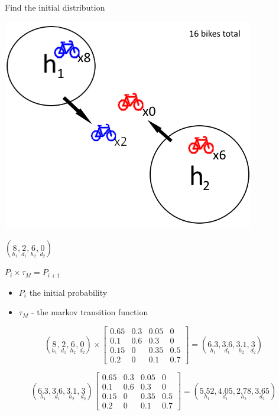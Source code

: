 \begin{frame}{Find the initial distribution}
\begin{center}

\includegraphics[scale=0.7]{graphics/initialworld2}
	
$(
\underset{h_1}{8},
\underset{d_1}{2},
\underset{h_2}{6},
\underset{d_2}{0}
)$
\end{center}
\end{frame}

\begin{frame}[fragile]
	

	
\begin{center}	
	
$ P_i \times \tau_M = P_{i+1}$\\

\begin{itemize}
	\item \textbf{$ P_i $} the initial probability
	\item \textbf{$ \tau_M $} - the markov transition function 
\end{itemize}
		
		

\[
(\underset{h_1}{8},
\underset{d_1}{2},
\underset{h_2}{6},
\underset{d_2}{0})
\times
\begin{bmatrix}
0.65 & 0.3 & 0.05 & 0\\
0.1  & 0.6 & 0.3  & 0\\
0.15 & 0   & 0.35 & 0.5\\
0.2  & 0   & 0.1  & 0.7
\end{bmatrix}
=
(
\underset{h_1}{6.3},
\underset{d_1}{3.6},
\underset{h_2}{3.1},
\underset{d_2}{3}
)
\]

\[
(
\underset{h_1}{6.3},
\underset{d_1}{3.6},
\underset{h_2}{3.1},
\underset{d_2}{3}
)
\begin{bmatrix}
0.65 & 0.3 & 0.05 & 0\\
0.1  & 0.6 & 0.3  & 0\\
0.15 & 0   & 0.35 & 0.5\\
0.2  & 0   & 0.1  & 0.7
\end{bmatrix}
=
(
\underset{h_1}{5.52},
\underset{d_1}{4.05},
\underset{h_2}{2.78},
\underset{d_2}{3.65}
)
\]


\end{center}
\end{frame}

